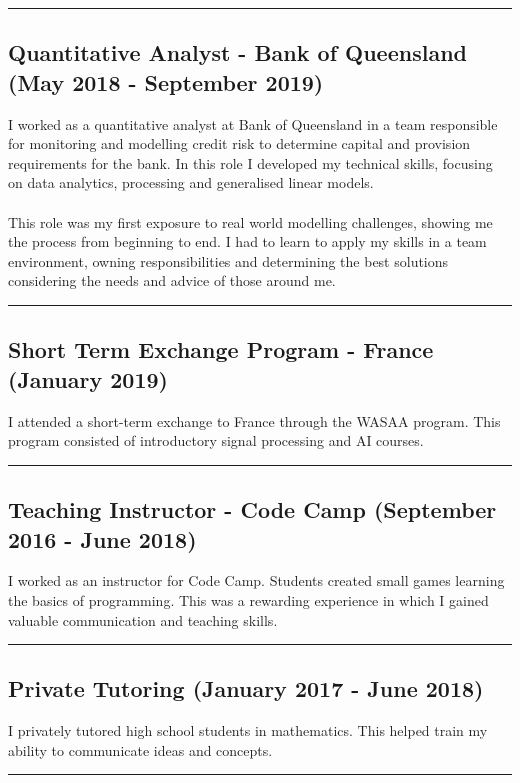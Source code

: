 \noindent\rule{\textwidth}{0.5pt}

\subsection*{Quantitative Analyst - Bank of Queensland (May 2018 - September 2019)}
I worked as a quantitative analyst at Bank of Queensland in a team responsible for monitoring and modelling credit risk to determine capital and provision requirements for the bank. In this role I developed my technical skills, focusing on data analytics, processing and generalised linear models.\\
\\
This role was my first exposure to real world modelling challenges, showing me the process from beginning to end. I had to learn to apply my skills in a team environment, owning responsibilities and determining the best solutions considering the needs and advice of those around me. 

\noindent\rule{\textwidth}{0.5pt}

\subsection*{Short Term Exchange Program - France (January 2019)}

I attended a short-term exchange to France through the WASAA program. This program consisted of introductory signal processing and AI courses.  

\noindent\rule{\textwidth}{0.5pt}

\subsection*{Teaching Instructor - Code Camp (September 2016 - June 2018)}
I worked as an instructor for Code Camp. Students created small games learning the basics of programming. This was a rewarding experience in which I gained valuable communication and teaching skills. 

\noindent\rule{\textwidth}{0.5pt}

\subsection*{Private Tutoring (January 2017 - June 2018)}
I privately tutored high school students in mathematics. This helped train my ability to communicate ideas and concepts.

\noindent\rule{\textwidth}{0.5pt}

